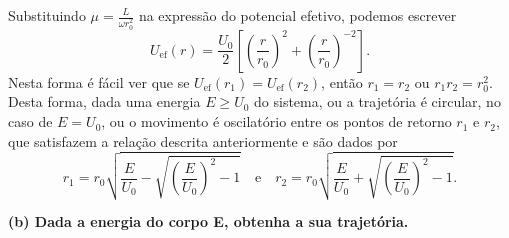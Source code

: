 Substituindo \(\mu = \frac{L}{\omega r_0^2}\) na expressão do potencial efetivo, podemos escrever
\begin{equation}
    U_\mathrm{ef}(r) = \frac{U_0}{2}\left[\left(\frac{r}{r_0}\right)^2 + \left(\frac{r}{r_0}\right)^{-2}\right].
\end{equation}
Nesta forma é fácil ver que se \(U_\mathrm{ef}(r_1) = U_\mathrm{ef}(r_2)\), então \(r_1 = r_2\) ou \(r_1r_2 = r_0^2\). Desta forma, dada uma energia \(E \geq U_0\) do sistema, ou a trajetória é circular, no caso de \(E = U_0\), ou o movimento é oscilatório entre os pontos de retorno \(r_1\) e \(r_2\), que satisfazem a relação descrita anteriormente e são dados por
\begin{equation}
    r_1 = r_0\sqrt{\frac{E}{U_0} - \sqrt{\left(\frac{E}{U_0}\right)^2 - 1}}\quad\text{e}\quad r_2 = r_0\sqrt{\frac{E}{U_0} + \sqrt{\left(\frac{E}{U_0}\right)^2 - 1}}.
\end{equation}

\textbf{(b) Dada a energia do corpo E, obtenha a sua trajetória.}

